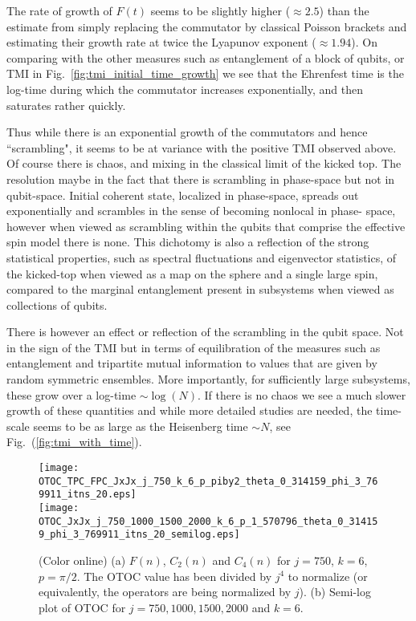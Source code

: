 \documentclass[pre,aps,showpacs,showkeys,twocolumn]{revtex4-1}
\theoremstyle{definition}
\theoremstyle{remark}
\begin{document}
The rate of growth of $F(t)$ seems to be slightly higher ($\approx 2.5$) than the estimate from simply replacing the commutator by classical Poisson brackets and estimating their growth rate at twice the Lyapunov exponent ($\approx 1.94$). On comparing with the other measures such as entanglement of a block of qubits, or TMI in Fig.~\ref{fig:tmi_initial_time_growth} we see that the Ehrenfest time is the log-time during which the commutator increases exponentially, and then saturates rather quickly.

Thus while there is an exponential growth of the commutators and hence ``scrambling", it seems to be at variance with the positive TMI observed above. Of course there is chaos, and mixing in the classical limit of the kicked top. The resolution maybe in the fact that there is scrambling in phase-space but not in qubit-space. Initial coherent state, localized in phase-space, spreads out exponentially and scrambles in the sense of becoming nonlocal in phase- space, however when viewed as scrambling within the qubits that comprise the effective spin model there is none. This dichotomy is also a reflection of the strong statistical properties, such as spectral fluctuations and eigenvector statistics,  of the kicked-top when viewed as a map on the sphere and a single large spin, compared to the marginal entanglement present in subsystems when viewed as collections of qubits.

There is however an effect or reflection of the scrambling in the qubit space. Not in the sign of the TMI but in terms of equilibration of the measures such as entanglement and tripartite mutual information to values that are given by random symmetric ensembles. More importantly, for sufficiently large subsystems, these grow over a log-time $ \sim \log(N)$. If there is no chaos we see a much slower growth of these quantities and while more detailed studies are needed, the time-scale seems to be as large as the Heisenberg time $\sim N$, see Fig.~(\ref{fig:tmi_with_time}).

\begin{figure}[!htpb]
    \texttt{[image: OTOC\_TPC\_FPC\_JxJx\_j\_750\_k\_6\_p\_piby2\_theta\_0\_314159\_phi\_3\_769911\_itns\_20.eps]}
    \\
    \texttt{[image: OTOC\_JxJx\_j\_750\_1000\_1500\_2000\_k\_6\_p\_1\_570796\_theta\_0\_314159\_phi\_3\_769911\_itns\_20\_semilog.eps]}

    \caption{(Color online) (a) $F(n)$, $C_2(n)$ and $C_4(n)$ for $j = 750$, $k = 6$, $p = \pi/2$. The OTOC value has been divided by $j^4$ to normalize (or equivalently, the operators are being normalized by $j$). (b) Semi-log plot of OTOC for $j = 750, 1000, 1500, 2000$ and $k = 6$.}
    \label{fig:OTOC_initial_time_growth}
\end{figure}
\end{document}
